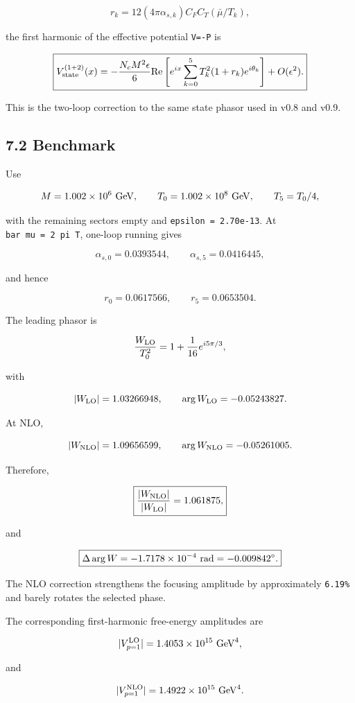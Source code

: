 \documentclass[
  10pt,
  a4paper,
]{article}
\begin{document}
\[
r_k
=
12(4\pi\alpha_{s,k})C_F C_T(\bar\mu/T_k),
\]

the first harmonic of the effective potential \texttt{V=-P} is

\[
\boxed{
V_{\rm state}^{(1+2)}(x)
=
-\frac{N_cM^2\epsilon}{6}
{\rm Re}\left[
e^{ix}
\sum_{k=0}^{5}T_k^2(1+r_k)e^{i\theta_k}
\right]
+O(\epsilon^2).
}
\]

This is the two-loop correction to the same state phasor used in v0.8
and v0.9.

\subsection{7.2 Benchmark}\label{benchmark}

Use

\[
M=1.002\times10^6\ {\rm GeV},
\qquad
T_0=1.002\times10^8\ {\rm GeV},
\qquad
T_5=T_0/4,
\]

with the remaining sectors empty and \texttt{epsilon\ =\ 2.70e-13}. At
\texttt{bar\ mu\ =\ 2\ pi\ T}, one-loop running gives

\[
\alpha_{s,0}=0.0393544,
\qquad
\alpha_{s,5}=0.0416445,
\]

and hence

\[
r_0=0.0617566,
\qquad
r_5=0.0653504.
\]

The leading phasor is

\[
\frac{W_{\rm LO}}{T_0^2}
=
1+\frac1{16}e^{i5\pi/3},
\]

with

\[
|W_{\rm LO}|=1.03266948,
\qquad
\arg W_{\rm LO}=-0.05243827.
\]

At NLO,

\[
|W_{\rm NLO}|=1.09656599,
\qquad
\arg W_{\rm NLO}=-0.05261005.
\]

Therefore,

\[
\boxed{
\frac{|W_{\rm NLO}|}{|W_{\rm LO}|}=1.061875,
}
\]

and

\[
\boxed{
\Delta\arg W=-1.7178\times10^{-4}\ {\rm rad}
=-0.009842^\circ.
}
\]

The NLO correction strengthens the focusing amplitude by approximately
\texttt{6.19\%} and barely rotates the selected phase.

The corresponding first-harmonic free-energy amplitudes are

\[
|V_{p=1}^{\rm LO}|=1.4053\times10^{15}\ {\rm GeV}^4,
\]

and

\[
|V_{p=1}^{\rm NLO}|=1.4922\times10^{15}\ {\rm GeV}^4.
\]
\end{document}
